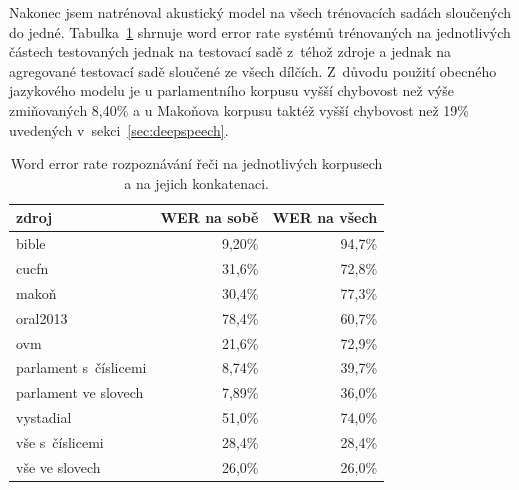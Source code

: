 Nakonec jsem natrénoval akustický model na všech trénovacích
sadách sloučených do jedné.
Tabulka~\ref{tab:csasr:results} shrnuje word error rate systémů trénovaných na
jednotlivých částech testovaných jednak na testovací sadě z~téhož zdroje a
jednak na agregované testovací sadě sloučené ze všech dílčích.
Z~důvodu použití obecného jazykového modelu je u parlamentního korpusu vyšší chybovost než
výše zmiňovaných 8,40\% a u Makoňova korpusu taktéž vyšší chybovost než 19\%
uvedených v~sekci~\ref{sec:deepspeech}.

\begin{table}[htpb]
\begin{center}
\begin{tabular}{|l||r|r|}
\hline
zdroj     & WER na sobě & WER na všech \\
\hline
bible     & 9,20\%  & 94,7\% \\
cucfn     & 31,6\%  & 72,8\% \\
makoň     & 30,4\%  & 77,3\% \\
oral2013  & 78,4\%  & 60,7\% \\
ovm       & 21,6\%  & 72,9\% \\
parlament s~číslicemi & 8,74\%  & 39,7\% \\
parlament ve slovech  & 7,89\%  & 36,0\% \\
vystadial & 51,0\%  & 74,0\% \\
\hline
vše s~číslicemi   & 28,4\%  & 28,4\% \\
vše ve slovech    & 26,0\%  & 26,0\% \\
\hline
\end{tabular}
\caption{Word error rate rozpoznávání řeči na jednotlivých korpusech a na jejich
konkatenaci.}\label{tab:csasr:results}
\end{center}
\end{table}

%
